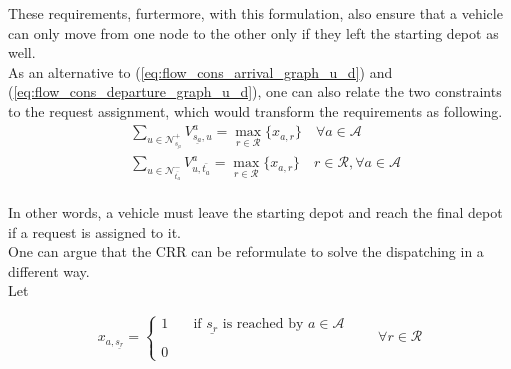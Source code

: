 These requirements, furtermore, with this formulation, also ensure that a vehicle can only move from one node to the other only if they left the starting depot as well. \\ 
As an alternative to (\ref{eq:flow_cons_arrival_graph_u_d}) and (\ref{eq:flow_cons_departure_graph_u_d}), one can also relate the two constraints to the request assignment, which would transform the requirements as following. 
\begin{align}
	&\sum_{ u \in \mathcal{N}^+_{\underline{s_a}} }V^a_{ \underline{s_a},u} = \underset{ r \in \mathcal{R}}{\max}\{x_{a,r}\} \quad  \forall a \in \mathcal{A} \label{eq:flow_cons_arrival_graph_u_d2}\\
	&\sum_{u \in \mathcal{N}^-_{\bar{t_a}} } V^a_{u, \bar{t_a}} = \underset{ r \in \mathcal{R}}{\max}\{x_{a,r}\}  \quad r \in \mathcal{R},  \forall a \in \mathcal{A} \label{eq:flow_cons_departure_graph_u_d2}
\end{align}\\
In other words, a vehicle must leave the starting depot and reach the final depot if a request is assigned to it. \\
One can argue that the CRR can be reformulate to solve the dispatching in a different way. \\
Let 

\begin{equation*}
	x_{a,\underline{s_r} }= 
	\begin{cases} 
		1 & \quad \text{if $\underline{s_r} $ is reached by }  a \in \mathcal{A}\\
		\\
		0
	\end{cases}
	\quad\quad \forall r \in \mathcal{R}
	\label{eq:var_dispatching}
\end{equation*}

